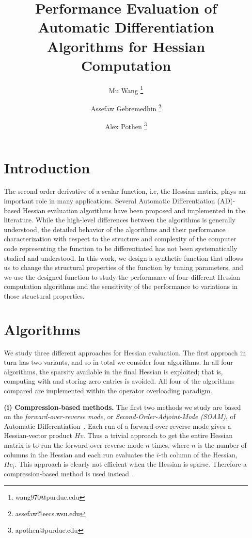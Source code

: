\documentclass[11pt, a4paper, english]{article}
\begin{document}
\title{Performance Evaluation of Automatic Differentiation Algorithms for Hessian Computation}
\author[1]{Mu Wang \thanks{wang970@purdue.edu}}
\author[2]{Assefaw Gebremedhin \thanks{assefaw@eecs.wsu.edu}}
\author[1]{Alex Pothen \thanks{apothen@purdue.edu}}
\maketitle

\section*{Introduction}
The second order derivative of a scalar function, i.e, the Hessian matrix, plays 
an important role in many applications. 
Several Automatic Differentiation (AD)-based Hessian evaluation algorithms have been proposed and implemented in the literature. While the high-level differences between the algorithms is generally understood, the detailed behavior of the algorithms and their performance characterization with respect to the structure and complexity of the computer code  representing the function to be differentiated has not been systematically studied and understood. In this work, we design a synthetic function that allows us to change the structural properties of the function by tuning parameters, and we use the designed function to study the performance of four different Hessian computation algorithms and the sensitivity of the performance to variations in those structural properties.

\section*{Algorithms}

We study three different approaches for Hessian evaluation. The first approach in turn has two variants, and so in total we consider four algorithms. In all four algorithms, 
the sparsity available in the final Hessian is exploited; that is, computing with and storing zero entries is avoided. All four of the algorithms compared are implemented within the operator overloading paradigm. 

{\bf (i) Compression-based methods. }
The first two methods we study are based on the {\em forward-over-reverse mode}, or {\em Second-Order-Adjoint-Mode (SOAM)}, of Automatic Differentiation~\cite{griewank2008evaluating, naumann2012art}. Each run of a forward-over-reverse mode gives a Hessian-vector product $Hv$. Thus a trivial approach to get the entire Hessian matrix is to run the forward-over-reverse mode $n$ times, where $n$ is the number of columns in the Hessian and each run evaluates the $i$-th column of the Hessian, $He_i$. This approach is clearly not efficient  when the Hessian is sparse.  Therefore a compression-based method is used instead \cite{gebremedhin2009efficient}. 
\end{document}
